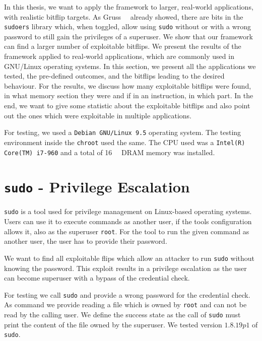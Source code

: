 In this thesis, we want to apply the framework to larger, real-world
applications, with realistic bitflip targets. As
Gruss~\etal~\cite{flipinthewall} already showed, there are bits in the
\texttt{sudoers} library which, when toggled, allow using \texttt{sudo} without
or with a wrong password to still gain the privileges of a superuser. We show
that our framework can find a larger number of exploitable bitflips. We present
the results of the framework applied to real-world applications, which are
commonly used in GNU/Linux operating systems. In this section, we present
all the applications we tested, the pre-defined outcomes, and the bitflips
leading to the desired behaviour. For the results, we discuss how many
exploitable bitflips were found, in what memory section they were and if in an
instruction, in which part. In the end, we want to give some statistic about the
exploitable bitflips and also point out the ones which were exploitable in
multiple applications.

For testing, we used a \texttt{Debian GNU/Linux 9.5} operating system. The
testing environment inside the \texttt{chroot} used the same. The CPU used
was a \mbox{\texttt{Intel(R) Core(TM) i7-960}} and a total of
\SI{16}{\giga\byte} DRAM memory was installed.

\section{\texttt{sudo} - Privilege Escalation}

\texttt{sudo} is a tool used for privilege management on Linux-based operating
systems. Users can use it to execute commands as another user, if the
tool\textquotesingle s configuration allows it, also as the superuser
\texttt{root}. For the tool to run the given command as another user, the user
has to provide their password.

We want to find all exploitable flips which allow an attacker to run
\texttt{sudo} without knowing the password. This exploit results in a
privilege escalation as the user can become superuser with a bypass of the
credential check.

For testing we call \texttt{sudo} and provide a wrong password for the
credential check. As command we provide reading a file which is owned by
\texttt{root} and can not be read by the calling user. We define the success
state as the call of \texttt{sudo} must print the content of the file owned by
the superuser. We tested version $1.8.19p1$ of \texttt{sudo}.

